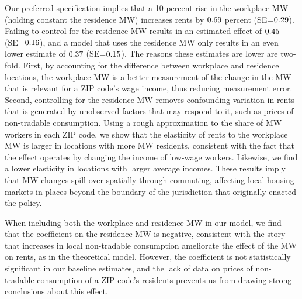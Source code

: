 
Our preferred specification implies that 
a 10 percent rise in the workplace MW (holding constant the residence MW) 
increases rents by $0.69$ percent (SE=$0.29$).
Failing to control for the residence MW results in an estimated effect of 
$0.45$ (SE=$0.16$), and a model that uses 
the residence MW only results in an even lower estimate of 
$0.37$ (SE=$0.15$).
The reasons these estimates are lower are two-fold.
First, by accounting for the difference between workplace and residence 
locations, the workplace MW is a better measurement of the change in the MW 
that is relevant for a ZIP code's wage income, thus reducing measurement 
error.
Second, controlling for the residence MW removes confounding variation in
rents that is generated by unobserved factors that may respond to it, 
such as prices of non-tradable consumption.
Using a rough approximation to the share of MW workers in each ZIP code, we show 
that the elasticity of rents to the workplace MW is larger in locations 
with more MW residents, consistent with the fact that the effect operates by
changing the income of low-wage workers.
Likewise, we find a lower elasticity in locations with larger average incomes.
These results imply that MW changes spill over spatially through commuting, 
affecting local housing markets in places beyond the boundary of the 
jurisdiction that originally enacted the policy.

When including both the workplace and residence MW in our model, we find that 
the coefficient on the residence MW is negative, consistent with the story 
that increases in local non-tradable consumption ameliorate the effect of the
MW on rents, as in the theoretical model.
However, the coefficient is not statistically significant in our baseline
estimates, and the lack of data on prices of non-tradable consumption of a 
ZIP code's residents prevents us from drawing strong conclusions about 
this effect.


